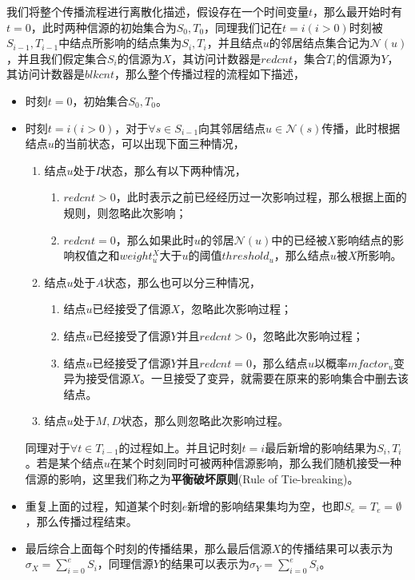 我们将整个传播流程进行离散化描述，假设存在一个时间变量$t$，那么最开始时有$t=0$，此时两种信源的初始集合为$S_{0}, T_{0}$，同理我们记在$t=i(i>0)$时刻被$S_{i-1}, T_{i-1}$中结点所影响的结点集为$S_{i}, T_{i}$，并且结点$u$的邻居结点集合记为$\mathcal{N}(u)$，并且我们假定集合$S_{i}$的信源为$X$，其访问计数器是$redcnt$，集合$T_{i}$的信源为$Y$，其访问计数器是$blkcnt$，那么整个传播过程的流程如下描述，
\begin{itemize}
\item 时刻$t=0$，初始集合$S_{0}, T_{0}$。
\item 时刻$t=i(i>0)$，对于$\forall s \in S_{i-1}$向其邻居结点$u \in \mathcal{N}(s)$传播，此时根据结点$u$的当前状态，可以出现下面三种情况，
	\begin{enumerate}
	\item 结点$u$处于$I$状态，那么有以下两种情况，
		\begin{enumerate}
		\item $redcnt>0$，此时表示之前已经经历过一次影响过程，那么根据上面的规则，则忽略此次影响；
		\item $redcnt=0$，那么如果此时$u$的邻居$\mathcal{N}(u)$中的已经被$X$影响结点的影响权值之和$weight_{u}^{X}$大于$u$的阈值$threshold_{u}$，那么结点$u$被$X$所影响。
		\end{enumerate}
	\item 结点$u$处于$A$状态，那么也可以分三种情况，
		\begin{enumerate}
		\item 结点$u$已经接受了信源$X$，忽略此次影响过程；
		\item 结点$u$已经接受了信源$Y$并且$redcnt>0$，忽略此次影响过程；
		\item 结点$u$已经接受了信源$Y$并且$redcnt=0$，那么结点$u$以概率$mfactor_{u}$变异为接受信源$X$。一旦接受了变异，就需要在原来的影响集合中删去该结点。
		\end{enumerate}
	\item 结点$u$处于$M,D$状态，那么则忽略此次影响过程。
	\end{enumerate}
	同理对于$\forall t \in T_{i-1}$的过程如上。并且记时刻$t=i$最后新增的影响结果为$S_{i}, T_{i}$。若是某个结点$u$在某个时刻同时可被两种信源影响，那么我们随机接受一种信源的影响，这里我们称之为\textbf{平衡破坏原则}(Rule of Tie-breaking)。
\item 重复上面的过程，知道某个时刻$e$新增的影响结果集均为空，也即$S_{e}=T_{e}=\emptyset$，那么传播过程结束。
\item 最后综合上面每个时刻的传播结果，那么最后信源$X$的传播结果可以表示为$\sigma_{X}=\sum_{i=0}^{e}S_{i}$，同理信源$Y$的结果可以表示为$\sigma_{Y}=\sum_{i=0}^{e}S_{i}$。
\end{itemize}

